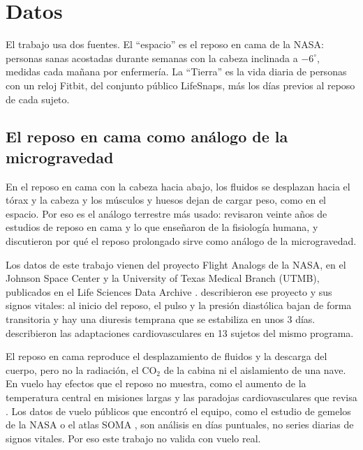 \chapter{Datos}\label{cap:datos}

El trabajo usa dos fuentes. El \enquote{espacio} es el reposo en cama de la NASA: personas sanas acostadas durante
semanas con la cabeza inclinada a $-6^\circ$, medidas cada mañana por enfermería. La \enquote{Tierra} es la vida
diaria de personas con un reloj Fitbit, del conjunto público LifeSnaps, más los días previos al reposo de cada sujeto.

\section{El reposo en cama como análogo de la microgravedad}

En el reposo en cama con la cabeza hacia abajo, los fluidos se desplazan hacia el tórax y la cabeza y los músculos y
huesos dejan de cargar peso, como en el espacio. Por eso es el análogo terrestre más usado: \textcite{pavy2007}
revisaron veinte años de estudios de reposo en cama y lo que enseñaron de la fisiología humana, y
\textcite{hargens2016} discutieron por qué el reposo prolongado sirve como análogo de la microgravedad.

Los datos de este trabajo vienen del proyecto Flight Analogs de la NASA, en el Johnson Space Center y la University of
Texas Medical Branch (UTMB), publicados en el Life Sciences Data Archive \parencite{lsda}. \textcite{meck2009}
describieron ese proyecto y sus signos vitales: al inicio del reposo, el pulso y la presión diastólica bajan de forma
transitoria y hay una diuresis temprana que se estabiliza en unos 3 días. \textcite{platts2009} describieron las
adaptaciones cardiovasculares en 13 sujetos del mismo programa.

\begin{cuidado}
El reposo en cama reproduce el desplazamiento de fluidos y la descarga del cuerpo, pero no la radiación, el CO$_2$ de
la cabina ni el aislamiento de una nave. En vuelo hay efectos que el reposo no muestra, como el aumento de la
temperatura central en misiones largas \parencite{stahn2017} y las paradojas cardiovasculares que revisa
\textcite{norsk2020}. Los datos de vuelo públicos que encontró el equipo, como el estudio de gemelos de la NASA
\parencite{garrettbakelman2019} o el atlas SOMA \parencite{overbey2024}, son análisis en días puntuales, no series
diarias de signos vitales. Por eso este trabajo no valida con vuelo real.
\end{cuidado}

